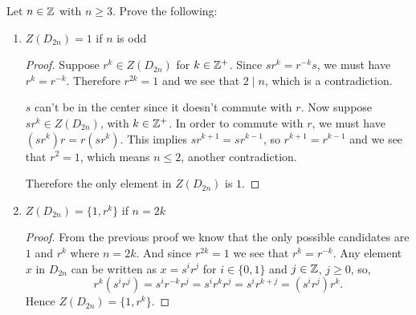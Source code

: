  Let $n\in\mathbb{Z}$ with $n\geq3$. Prove the following:
\begin{enumerate}
\item $Z(D_{2n}) = 1$ if $n$ is odd
  \begin{proof}
    Suppose $r^k\in Z(D_{2n})$ for $k\in\mathbb{Z}^+$. Since $sr^k = r^{-k}s$,
    we must have $r^k = r^{-k}$. Therefore $r^{2k} = 1$ and we see
    that $2 \mid n$, which is a contradiction.

    $s$ can't be in the center since it doesn't commute with $r$. Now
    suppose $sr^k\in Z(D_{2n})$, with $k\in\mathbb{Z}^+$. In order to commute
    with $r$, we must have $(sr^k)r = r(sr^k)$. This implies
    $sr^{k+1} = sr^{k-1}$, so $r^{k+1} = r^{k-1}$ and we see that
    $r^2 = 1$, which means $n \leq 2$, another contradiction.

    Therefore the only element in $Z(D_{2n})$ is $1$.
  \end{proof}
\item $Z(D_{2n}) = \{1,r^k\}$ if $n = 2k$
  \begin{proof}
    From the previous proof we know that the only possible candidates
    are $1$ and $r^k$ where $n = 2k$. And since $r^{2k} = 1$ we see
    that $r^k = r^{-k}$. Any element $x$ in $D_{2n}$ can be written as
    $x = s^ir^j$ for $i\in\{0,1\}$ and $j\in\mathbb{Z}$, $j\geq 0$, so,
    \begin{equation*}
      r^k(s^ir^j) = s^ir^{-k}r^j = s^ir^kr^j = s^ir^{k+j} = (s^ir^j)r^k.
    \end{equation*}
    Hence $Z(D_{2n}) = \{1, r^k\}$.
  \end{proof}
\end{enumerate}
